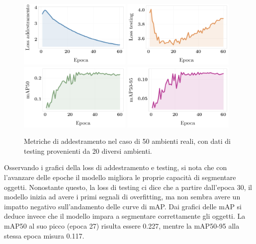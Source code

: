 \documentclass[12pt]{report}
\begin{document}
\begin{figure}[h!]
	\centering
	{\includegraphics[width=0.48\textwidth]{images/domain-shift/real-to-real/5/train-loss}}
	\hspace{0.01\textwidth}
	{\includegraphics[width=0.48\textwidth]{images/domain-shift/real-to-real/5/testing-loss}}
	\hspace{0.01\textwidth}
	\\
	{\includegraphics[width=0.48\textwidth]{images/domain-shift/real-to-real/5/map50}}
	\hspace{0.01\textwidth}
	{\includegraphics[width=0.48\textwidth]{images/domain-shift/real-to-real/5/map50-95}}
	\caption{Metriche di addestramento nel caso di 50 ambienti reali, con dati di testing provenienti da 20 diversi ambienti.}
	\label{fig:training-4}
\end{figure}

Osservando i grafici della loss di addestramento e testing, si nota che con l'avanzare delle epoche il modello migliora le proprie capacità di segmentare oggetti. Nonostante questo, la loss di testing ci dice che a partire dall'epoca 30, il modello inizia ad avere i primi segnali di overfitting, ma non sembra avere un impatto negativo sull'andamento delle curve di mAP. Dai grafici delle mAP si deduce invece che il modello impara a segmentare correttamente gli oggetti. La mAP50 al suo picco (epoca 27) risulta essere 0.227, mentre la mAP50-95 alla stessa epoca misura 0.117.
\end{document}
